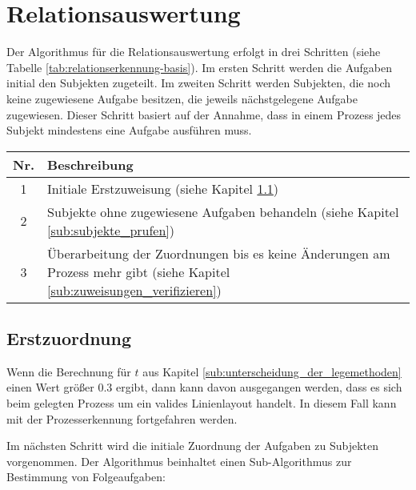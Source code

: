 \section{Relationsauswertung} %
\label{sub:relationsauswertung}
Der Algorithmus für die Relationsauswertung erfolgt in drei Schritten (siehe Tabelle \ref{tab:relationserkennung-basis}). Im ersten Schritt werden die Aufgaben initial den Subjekten zugeteilt. Im zweiten Schritt werden Subjekten, die noch keine zugewiesene Aufgabe besitzen, die jeweils nächstgelegene Aufgabe zugewiesen. Dieser Schritt basiert auf der Annahme, dass in einem Prozess jedes Subjekt mindestens eine Aufgabe ausführen muss.

\begin{center}
	\label{tab:relationserkennung-basis}
	\begin{tabularx}
		{1.0\linewidth}{ c X } \textbf{Nr.} & \textbf{Beschreibung} \\
		\hline 1 & Initiale Erstzuweisung (siehe Kapitel \ref{sub:erstzuordnung}) \\
		\hline 2 & Subjekte ohne zugewiesene Aufgaben behandeln (siehe Kapitel \ref{sub:subjekte_prufen}) \\
		\hline 3 & Überarbeitung der Zuordnungen bis es keine Änderungen am Prozess mehr gibt (siehe Kapitel \ref{sub:zuweisungen_verifizieren})\\
	\end{tabularx}
\end{center}

\subsection{Erstzuordnung} %
\label{sub:erstzuordnung}
Wenn die Berechnung für $t$ aus Kapitel \ref{sub:unterscheidung_der_legemethoden} einen Wert größer $0.3$ ergibt, dann kann davon ausgegangen werden, dass es sich beim gelegten Prozess um ein valides Linienlayout handelt. In diesem Fall kann mit der Prozesserkennung fortgefahren werden.

Im nächsten Schritt wird die initiale Zuordnung der Aufgaben zu Subjekten vorgenommen. Der Algorithmus beinhaltet einen Sub-Algorithmus zur Bestimmung von Folgeaufgaben:
 
